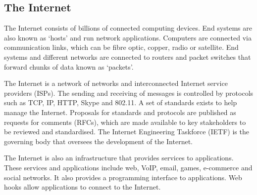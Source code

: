 \subsection{The Internet}

The Internet consists of billions of connected computing devices.
End systems are also known as `hosts' and run network applications.
Computers are connected via communication links, which can be fibre optic, copper, radio or satellite.
End systems and different networks are connected to routers and packet switches that forward chunks of data known as `packets'.

The Internet is a network of networks and interconnected Internet service providers (ISPs).
The sending and receiving of messages is controlled by protocols such as TCP, IP, HTTP, Skype and 802.11.
A set of standards exists to help manage the Internet.
Proposals for standards and protocols are published as requests for comments (RFCs), which are made available to key stakeholders to be reviewed and standardised.
The Internet Engineering Taskforce (IETF) is the governing body that oversees the development of the Internet.

The Internet is also an infrastructure that provides services to applications.
These services and applications include web, VoIP, email, games, e-commerce and social networks.
It also provides a programming interface to applications.
Web hooks allow applications to connect to the Internet.

